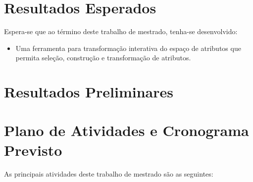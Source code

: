 \section{Resultados Esperados}

Espera-se que ao término deste trabalho de mestrado,
tenha-se desenvolvido:

\begin{itemize}
    \item Uma ferramenta para
        transformação interativa do espaço de atributos que
        permita seleção, construção e transformação de
        atributos.
\end{itemize}

\section{Resultados Preliminares}


\section{Plano de Atividades e Cronograma Previsto}\label{sec:cronograma}

As principais atividades deste trabalho de mestrado são as seguintes:

